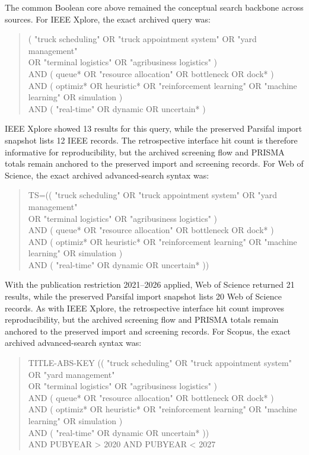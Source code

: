 \documentclass[preprint,12pt,number,longtitle]{elsarticle}
\begin{document}
The common Boolean core above remained the conceptual search backbone across sources. For IEEE Xplore, the exact archived query was:

\begin{quote}
\footnotesize
\ttfamily
( "truck scheduling" OR "truck appointment system" OR "yard management"\\
OR "terminal logistics" OR "agribusiness logistics" )\\
AND ( queue* OR "resource allocation" OR bottleneck OR dock* )\\
AND ( optimiz* OR heuristic* OR "reinforcement learning" OR "machine learning" OR simulation )\\
AND ( "real-time" OR dynamic OR uncertain* )
\end{quote}

IEEE Xplore showed 13 results for this query, while the preserved Parsifal import snapshot lists 12 IEEE records. The retrospective interface hit count is therefore informative for reproducibility, but the archived screening flow and PRISMA totals remain anchored to the preserved import and screening records. For Web of Science, the exact archived advanced-search syntax was:

\begin{quote}
\footnotesize
\ttfamily
TS=(( "truck scheduling" OR "truck appointment system" OR "yard management"\\
OR "terminal logistics" OR "agribusiness logistics" )\\
AND ( queue* OR "resource allocation" OR bottleneck OR dock* )\\
AND ( optimiz* OR heuristic* OR "reinforcement learning" OR "machine learning" OR simulation )\\
AND ( "real-time" OR dynamic OR uncertain* ))
\end{quote}

With the publication restriction 2021--2026 applied, Web of Science returned 21 results, while the preserved Parsifal import snapshot lists 20 Web of Science records. As with IEEE Xplore, the retrospective interface hit count improves reproducibility, but the archived screening flow and PRISMA totals remain anchored to the preserved import and screening records. For Scopus, the exact archived advanced-search syntax was:

\begin{quote}
\footnotesize
\ttfamily
TITLE-ABS-KEY (( "truck scheduling" OR "truck appointment system" OR "yard management"\\
OR "terminal logistics" OR "agribusiness logistics" )\\
AND ( queue* OR "resource allocation" OR bottleneck OR dock* )\\
AND ( optimiz* OR heuristic* OR "reinforcement learning" OR "machine learning" OR simulation )\\
AND ( "real-time" OR dynamic OR uncertain* ))\\
AND PUBYEAR > 2020 AND PUBYEAR < 2027
\end{quote}
\end{document}
